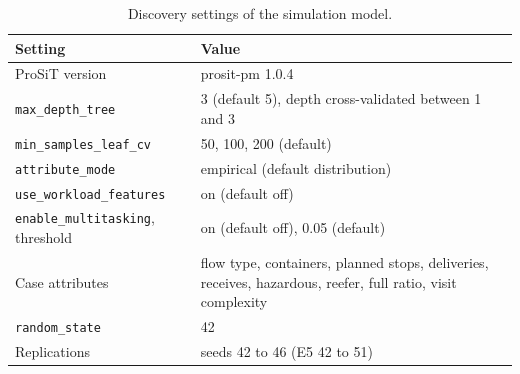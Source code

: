 \begin{table}[htbp]
\centering
\small
\begin{tabularx}{\textwidth}{L{4.6cm}Y}
\toprule
\textbf{Setting} & \textbf{Value} \\
\midrule
ProSiT version & prosit-pm 1.0.4 \\
\texttt{max\_depth\_tree} & 3 (default 5), depth cross-validated between 1 and 3 \\
\texttt{min\_samples\_leaf\_cv} & 50, 100, 200 (default) \\
\texttt{attribute\_mode} & empirical (default distribution) \\
\texttt{use\_workload\_features} & on (default off) \\
\texttt{enable\_multitasking}, threshold & on (default off), 0.05 (default) \\
Case attributes & flow type, containers, planned stops, deliveries, receives, hazardous, reefer, full ratio, visit complexity \\
\texttt{random\_state} & 42 \\
Replications & seeds 42 to 46 (E5 42 to 51) \\
\bottomrule
\end{tabularx}
\caption{Discovery settings of the simulation model.}
\label{tab:sim_hyperparameters}
\end{table}
